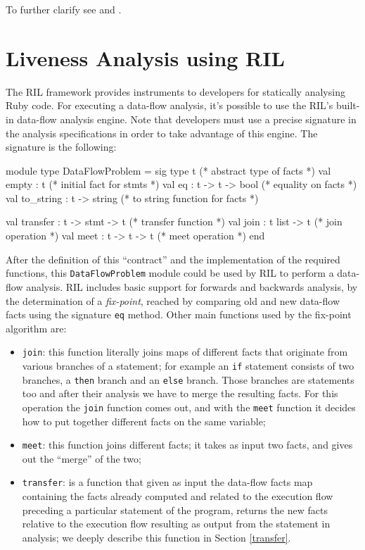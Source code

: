 \documentclass[a4paper]{article}   %
\begin{document}
To further clarify see \cite{meo} and \cite{ril}.

\section{Liveness Analysis using RIL}

The RIL framework provides instruments to developers for statically analysing Ruby code. For executing a data-flow analysis, it's possible to use the RIL's built-in data-flow analysis engine. Note that developers must use a precise signature in the analysis specifications in order to take advantage of this engine. The signature is the following:

\begin{ocaml}
module type DataFlowProblem =
sig
    type t                          (* abstract type of facts *)
    val empty : t                   (* initial fact for stmts *)
    val eq : t -> t -> bool         (* equality on facts *)
    val to_string : t -> string     (* to string function for facts *)

    val transfer : t -> stmt -> t   (* transfer function *)
    val join : t list -> t          (* join operation *)
    val meet : t -> t -> t          (* meet operation *)
end
\end{ocaml}

After the definition of this ``contract'' and the implementation of the required functions, this \texttt{DataFlowProblem} module could be used by RIL to perform a data-flow analysis. RIL includes basic support for forwards and backwards analysis, by the determination of a \emph{fix-point}, reached by comparing old and new data-flow facts using the signature \texttt{eq} method. Other main functions used by the fix-point algorithm are:
\begin{itemize}
\item \texttt{join}: this function literally joins maps of different facts that originate from various branches of a statement; for example an \texttt{if} statement consists of two branches, a \texttt{then} branch and an \texttt{else} branch. Those branches are statements too and after their analysis we have to merge the resulting facts. For this operation the \texttt{join} function comes out, and with the \texttt{meet} function it decides how to put together different facts on the same variable;

\item \texttt{meet}: this function joins different facts; it takes as input two facts, and gives out the ``merge'' of the two;

\item \texttt{transfer}: is a function that given as input the data-flow facts map containing the facts already computed and related to the execution flow preceding a particular statement of the program, returns the new facts relative to the execution flow resulting as output from the statement in analysis; we deeply describe this function in Section \ref{transfer}.
\end{itemize}
\end{document}
